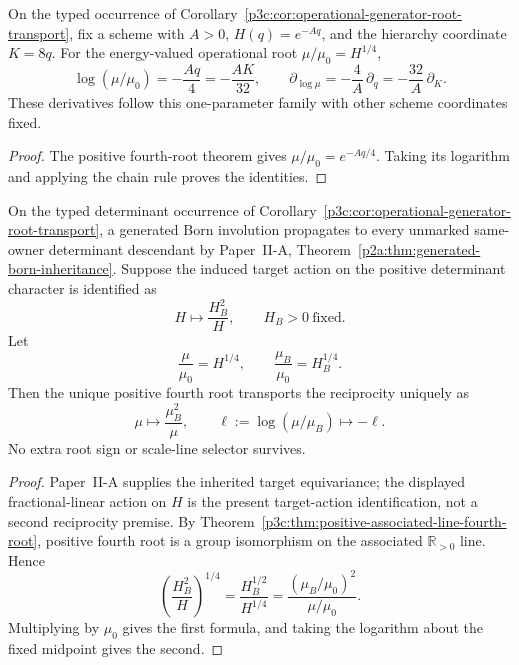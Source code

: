 \documentclass[12pt,a4paper]{article}
\begin{document}
\begin{corollary}
\label{p3c:cor:v199-rgas-operational-clock}
On the typed occurrence of
Corollary~\ref{p3c:cor:operational-generator-root-transport}, fix a scheme
with \(A>0\), \(H(q)=e^{-Aq}\), and the hierarchy coordinate \(K=8q\).
For the energy-valued operational root \(\mu/\mu_0=H^{1/4}\),
\begin{equation}
\label{p3c:eq:v199-rgas-clock}
 \log(\mu/\mu_0)=-\frac{Aq}{4}=-\frac{AK}{32},
 \qquad
 \partial_{\log\mu}=-\frac4A\,\partial_q
                 =-\frac{32}{A}\,\partial_K .
\end{equation}
These derivatives follow this one-parameter family with other scheme
coordinates fixed.
\end{corollary}
\begin{proof}
The positive fourth-root theorem gives \(\mu/\mu_0=e^{-Aq/4}\).
Taking its logarithm and applying the chain rule proves the identities.
\end{proof}

\begin{theorem}
\label{p3c:thm:born-fourth-root-inversion}
On the typed determinant occurrence of
Corollary~\ref{p3c:cor:operational-generator-root-transport}, a generated
Born involution propagates to every unmarked same-owner determinant descendant
by Paper~II-A, Theorem~\ref{p2a:thm:generated-born-inheritance}.  Suppose the
induced target action on the positive determinant character is identified as
\[
 H\longmapsto \frac{H_B^2}{H},
 \qquad H_B>0\ \text{fixed}.
\]
Let
\[
 \frac{\mu}{\mu_0}=H^{1/4},
 \qquad
 \frac{\mu_B}{\mu_0}=H_B^{1/4}.
\]
Then the unique positive fourth root transports the reciprocity uniquely as
\[
 \boxed{\mu\longmapsto\frac{\mu_B^2}{\mu}},
 \qquad
 \boxed{\ell:=\log(\mu/\mu_B)\longmapsto-\ell}.
\]
No extra root sign or scale-line selector survives.
\end{theorem}

\begin{proof}
Paper~II-A supplies the inherited target equivariance; the displayed
fractional-linear action on $H$ is the present target-action identification,
not a second reciprocity premise.  By
Theorem~\ref{p3c:thm:positive-associated-line-fourth-root}, positive fourth
root is a group isomorphism on the associated $\mathbb R_{>0}$ line.  Hence
\[
 \left(\frac{H_B^2}{H}\right)^{1/4}
 =\frac{H_B^{1/2}}{H^{1/4}}
 =\frac{(\mu_B/\mu_0)^2}{\mu/\mu_0}.
\]
Multiplying by $\mu_0$ gives the first formula, and taking the logarithm about
the fixed midpoint gives the second.
\end{proof}
\end{document}
